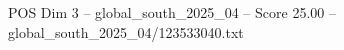 \begin{textsample}{POS Dim 3 – global\_south\_2025\_04 – Score 25.00 – global\_south\_2025\_04/123533040.txt}
\end{textsample}
